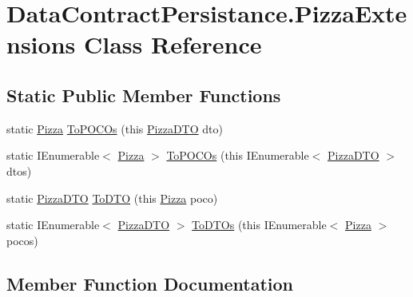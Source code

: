 \hypertarget{classDataContractPersistance_1_1PizzaExtensions}{}\section{Data\+Contract\+Persistance.\+Pizza\+Extensions Class Reference}
\label{classDataContractPersistance_1_1PizzaExtensions}
\subsection*{Static Public Member Functions}
\begin{DoxyCompactItemize}
\item 
static \hyperlink{classModele_1_1Pizza}{Pizza} \hyperlink{classDataContractPersistance_1_1PizzaExtensions_aa2b658bfc6fd2fd74030dabb09ceddb2}{To\+P\+O\+C\+Os} (this \hyperlink{classDataContractPersistance_1_1PizzaDTO}{Pizza\+D\+TO} dto)
\item 
static I\+Enumerable$<$ \hyperlink{classModele_1_1Pizza}{Pizza} $>$ \hyperlink{classDataContractPersistance_1_1PizzaExtensions_a45435c062a8390d7459cc3af348f23e5}{To\+P\+O\+C\+Os} (this I\+Enumerable$<$ \hyperlink{classDataContractPersistance_1_1PizzaDTO}{Pizza\+D\+TO} $>$ dtos)
\item 
static \hyperlink{classDataContractPersistance_1_1PizzaDTO}{Pizza\+D\+TO} \hyperlink{classDataContractPersistance_1_1PizzaExtensions_a73beb3014b7b9a5e7ab4aca39632e761}{To\+D\+TO} (this \hyperlink{classModele_1_1Pizza}{Pizza} poco)
\item 
static I\+Enumerable$<$ \hyperlink{classDataContractPersistance_1_1PizzaDTO}{Pizza\+D\+TO} $>$ \hyperlink{classDataContractPersistance_1_1PizzaExtensions_a6baa7ee87577e34d43dad18f5211b66d}{To\+D\+T\+Os} (this I\+Enumerable$<$ \hyperlink{classModele_1_1Pizza}{Pizza} $>$ pocos)
\end{DoxyCompactItemize}


\subsection{Member Function Documentation}
\mbox{\label{classDataContractPersistance_1_1PizzaExtensions_a73beb3014b7b9a5e7ab4aca39632e761}} 
